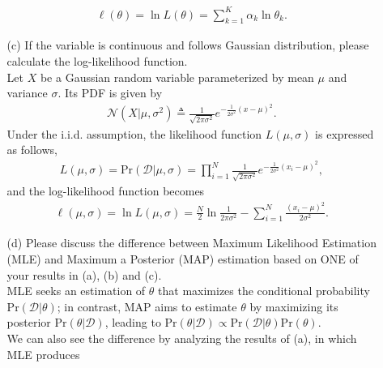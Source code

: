 \documentclass[10pt]{article}
\newcommand{\pr}[1]{\text{Pr} #1}
\begin{document}
\begin{enumerate}[1.]
\begin{itemize}
{\begin{align*}
                        \ell(\theta) = \ln L(\theta)  = \sum_{k=1}^K\alpha_k\ln\theta_k.
                    \end{align*}
                    }
              \item[(c)] If the variable is continuous and follows Gaussian distribution, please calculate the log-likelihood function. ~\\
                    { \color{blue}
                    Let $X$ be a Gaussian random variable parameterized by mean $\mu$ and variance $\sigma$.
                    Its PDF is given by
                    \begin{align*}
                        \mathcal{N}\left(X | \mu, \sigma^{2}\right) \triangleq \frac{1}{\sqrt{2 \pi \sigma^{2}}} e^{-\frac{1}{2 \sigma^{2}}(x-\mu)^{2}}.
                    \end{align*}
                    Under the i.i.d. assumption, the likelihood function $L(\mu, \sigma)$ is expressed as follows,
                    \begin{align*}
                        L(\mu, \sigma) = \pr(\mathcal{D}|\mu, \sigma) = \prod_{i=1}^N\frac{1}{\sqrt{2 \pi \sigma^{2}}} e^{-\frac{1}{2 \sigma^{2}}(x_i-\mu)^{2}},
                    \end{align*}
                    and the log-likelihood function becomes
                    \begin{align*}
                        \ell(\mu, \sigma) = \ln L(\mu, \sigma) = \frac{N}{2}\ln \frac{1}{2\pi\sigma^2} - \sum_{i=1}^N\frac{(x_i-\mu)^2}{2\sigma^2}.
                    \end{align*}
                    }
              \item[(d)] Please discuss the difference between Maximum Likelihood Estimation (MLE) and Maximum a Posterior (MAP) estimation
                    based on ONE of your results in (a), (b) and (c). ~\\
                    {\color{blue}
                    MLE seeks an estimation of $\theta$ that maximizes the conditional probability $\pr (\mathcal{D}|\theta)$;
                    in contrast, MAP aims to estimate $\theta$ by maximizing its posterior $\pr (\theta |\mathcal{D})$, 
                    leading to $\pr (\theta |\mathcal{D}) \propto \pr (\mathcal{D}|\theta) \pr (\theta)$. \\
                    We can also see the difference by analyzing the results of (a), in which MLE produces
                    \begin{align*}

\end{align*}}
\end{itemize}
\end{enumerate}
\end{document}
